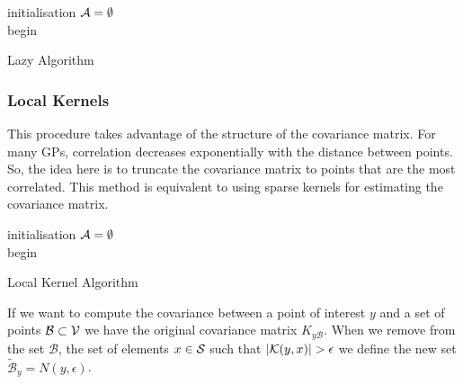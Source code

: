 \begin{algorithm}[h]
 initialisation\;
 $\A = \emptyset$ \\
 begin\;
\caption{Lazy Algorithm}
\label{alg:lazy}
\end{algorithm}

\subsubsection{Local Kernels} This procedure takes advantage of the structure of the covariance matrix. For many GPs, correlation decreases exponentially with the distance between points. So, the idea here is to truncate the covariance matrix to points that are the most correlated. This method is equivalent to using sparse kernels for estimating the covariance matrix. \\

\begin{algorithm}[h]
 initialisation\;
 $\A = \emptyset$ \\
 begin\;
\caption{Local Kernel Algorithm}
\label{alg:local}
\end{algorithm} 
 

If we want to compute the covariance between a point of interest $y$ and a set of points $\mathcal{B} \subset \V $ we have the original covariance matrix $K_{y\mathcal{B}}$. When we remove from the set $\mathcal{B}$, the set of elements  $x \in \S$ such that $|\K(y,x)| > \epsilon $ we define the new set  $\tilde{\mathcal{B}}_y = N(y,\epsilon)$. \\


